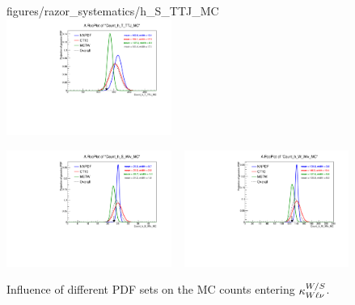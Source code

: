 \begin{figure}[p]
{figures/razor_systematics/h_S_TTJ_MC}
~
\includegraphics[width=0.48\textwidth,clip=true,trim=0 0.2cm 0 1.2cm]
{figures/razor_systematics/h_T_TTJ_MC}
\caption{Influence of different PDF sets on the MC counts entering $\kappa_{t\bar{t}+t}^{T/S}$.
\label{fig:PDF_effect_on_bg_TTJ}}
\vspace{2eM}
\includegraphics[width=0.48\textwidth,clip=true,trim=0 0.2cm 0 1.2cm]
{figures/razor_systematics/h_S_Wlv_MC}
~
\includegraphics[width=0.48\textwidth,clip=true,trim=0 0.2cm 0 1.2cm]
{figures/razor_systematics/h_W_Wlv_MC}
\caption{Influence of different PDF sets on the MC counts entering $\kappa_{W\ell\nu}^{W/S}$.
\label{fig:PDF_effect_on_bg_Wlv}}
\end{figure}


